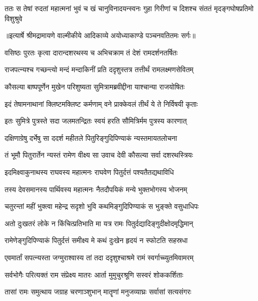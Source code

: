 \fourlineindentedshloka
{ततः स तेषां रुदतां महात्मनां}
{ भुवं च खं चानुविनादयन्स्वनः}
{गुहा गिरीणां च दिशश्च संततं}
{ मृदङ्गघोषप्रतिमो विशुश्रुवे} %


{॥इत्यार्षे श्रीमद्रामायणे वाल्मीकीये आदिकाव्ये अयोध्याकाण्डे पञ्चनवतितमः सर्गः॥}


\twolineshloka
{वसिष्ठः पुरतः कृत्वा दारान्दशरथस्य च}
{अभिचक्राम तं देशं रामदर्शनतर्षितः} %

\twolineshloka
{राजपत्न्यश्च गच्छन्त्यो मन्दं मन्दाकिनीं प्रति}
{ददृशुस्तत्र तत्तीर्थं रामलक्ष्मणसेवितम्} %

\twolineshloka
{कौसल्या बाष्पपूर्णेन मुखेन परिशुष्यता}
{सुमित्रामब्रवीद्दीना याश्चान्या राजयोषितः} %

\twolineshloka
{इदं तेषामनाथानां क्लिष्टमक्लिष्ट कर्मणाम्}
{वने प्राक्केवलं तीर्थं ये ते निर्विषयी कृताः} %

\twolineshloka
{इतः सुमित्रे पुत्रस्ते सदा जलमतन्द्रितः}
{स्वयं हरति सौमित्रिर्मम पुत्रस्य कारणात्} %

\twolineshloka
{दक्षिणाग्रेषु दर्भेषु सा ददर्श महीतले}
{पितुरिङ्गुदिपिण्याकं न्यस्तमायतलोचना} %

\twolineshloka
{तं भूमौ पितुरार्तेन न्यस्तं रामेण वीक्ष्य सा}
{उवाच देवी कौसल्या सर्वा दशरथस्त्रियः} %

\twolineshloka
{इदमिक्ष्वाकुनाथस्य राघवस्य महात्मनः}
{राघवेण पितुर्दत्तं पश्यतैतद्यथाविधि} %

\twolineshloka
{तस्य देवसमानस्य पार्थिवस्य महात्मनः}
{नैतदौपयिकं मन्ये भुक्तभोगस्य भोजनम्} %

\twolineshloka
{चतुरन्तां महीं भुक्त्वा महेन्द्र सदृशो भुवि}
{कथमिङ्गुदिपिण्याकं स भुङ्क्ते वसुधाधिपः} %

\twolineshloka
{अतो दुःखतरं लोके न किंचित्प्रतिभाति मा}
{यत्र रामः पितुर्दद्यादिङ्गुदीक्षोदमृद्धिमान्} %

\twolineshloka
{रामेणेङ्गुदिपिण्याकं पितुर्दत्तं समीक्ष्य मे}
{कथं दुःखेन हृदयं न स्फोटति सहस्रधा} %

\twolineshloka
{एवमार्तां सपत्न्यस्ता जग्मुराश्वास्य तां तदा}
{ददृशुश्चाश्रमे रामं स्वर्गाच्च्युतमिवामरम्} %

\twolineshloka
{सर्वभोगैः परित्यक्तं राम संप्रेक्ष्य मातरः}
{आर्ता मुमुचुरश्रूणि सस्वरं शोककर्शिताः} %

\twolineshloka
{तासां रामः समुत्थाय जग्राह चरणाञ्शुभान्}
{मातॄणां मनुजव्याघ्रः सर्वासां सत्यसंगरः} %

